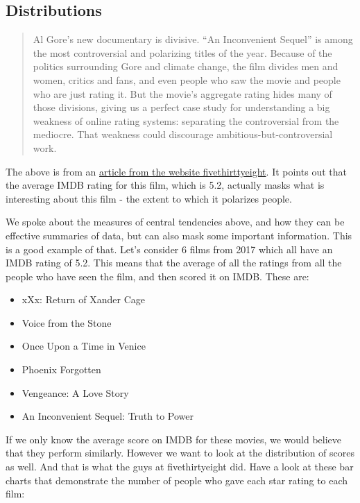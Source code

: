 \documentclass[]{book}
\providecommand{\tightlist}{%
  \setlength{\itemsep}{0pt}\setlength{\parskip}{0pt}}
\theoremstyle{definition}
\theoremstyle{definition}
\theoremstyle{definition}
\theoremstyle{remark}
\begin{document}
\hypertarget{distributions}{%
\subsection{Distributions}\label{distributions}}

\begin{quote}
Al Gore's new documentary is divisive. ``An Inconvenient Sequel'' is
among the most controversial and polarizing titles of the year. Because
of the politics surrounding Gore and climate change, the film divides
men and women, critics and fans, and even people who saw the movie and
people who are just rating it. But the movie's aggregate rating hides
many of those divisions, giving us a perfect case study for
understanding a big weakness of online rating systems: separating the
controversial from the mediocre. That weakness could discourage
ambitious-but-controversial work.
\end{quote}

The above is from an
\href{https://fivethirtyeight.com/features/al-gores-new-movie-exposes-the-big-flaw-in-online-movie-ratings/}{article
from the website fivethirttyeight}. It points out that the average IMDB
rating for this film, which is 5.2, actually masks what is interesting
about this film - the extent to which it polarizes people.

We spoke about the measures of central tendencies above, and how they
can be effective summaries of data, but can also mask some important
information. This is a good example of that. Let's consider 6 films from
2017 which all have an IMDB rating of 5.2. This means that the average
of all the ratings from all the people who have seen the film, and then
scored it on IMDB. These are:

\begin{itemize}
\tightlist
\item
  xXx: Return of Xander Cage
\item
  Voice from the Stone
\item
  Once Upon a Time in Venice
\item
  Phoenix Forgotten
\item
  Vengeance: A Love Story
\item
  An Inconvenient Sequel: Truth to Power
\end{itemize}

If we only know the average score on IMDB for these movies, we would
believe that they perform similarly. However we want to look at the
distribution of scores as well. And that is what the guys at
fivethirtyeight did. Have a look at these bar charts that demonstrate
the number of people who gave each star rating to each film:
\end{document}
